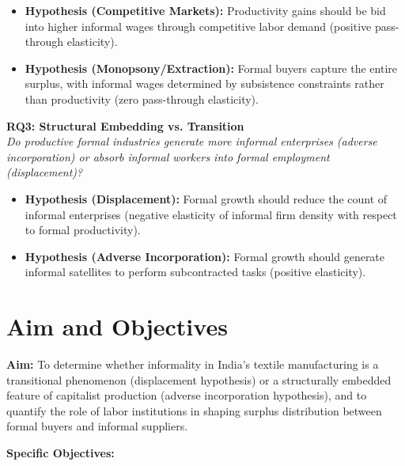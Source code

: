 \begin{itemize}
	\item \textbf{Hypothesis (Competitive Markets):} Productivity gains should be bid into higher informal wages through competitive labor demand (positive pass-through elasticity).
	\item \textbf{Hypothesis (Monopsony/Extraction):} Formal buyers capture the entire surplus, with informal wages determined by subsistence constraints rather than productivity (zero pass-through elasticity).
\end{itemize}

\textbf{RQ3: Structural Embedding vs. Transition}\\
\emph{Do productive formal industries generate more informal enterprises (adverse incorporation) or absorb informal workers into formal employment (displacement)?}

\begin{itemize}
	\item \textbf{Hypothesis (Displacement):} Formal growth should reduce the count of informal enterprises (negative elasticity of informal firm density with respect to formal productivity).
	\item \textbf{Hypothesis (Adverse Incorporation):} Formal growth should generate informal satellites to perform subcontracted tasks (positive elasticity).
\end{itemize}


\section{Aim and Objectives}

\textbf{Aim:} To determine whether informality in India's textile manufacturing is a transitional phenomenon (displacement hypothesis) or a structurally embedded feature of capitalist production (adverse incorporation hypothesis), and to quantify the role of labor institutions in shaping surplus distribution between formal buyers and informal suppliers.

\textbf{Specific Objectives:}

